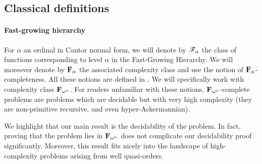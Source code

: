 %	
%	


\subsection{Classical definitions}

\paragraph*{Fast-growing hierarchy}

For $\alpha$ an ordinal in Cantor normal form, we will denote by $\mathscr{F}_{\alpha}$ the class of functions corresponding to level $\alpha$ in the Fast-Growing Hierarchy. We will moreover denote by $\mathbf{F}_{\alpha}$ the associated complexity class and use the notion of $\mathbf{F}_{\alpha}$-completeness. All these notions are defined in \cite{Schmitz16}. We will specifically work with complexity class $\mathbf{F}_{\omega^{\omega}}$. For readers unfamiliar with these notions, $\mathbf{F}_{\omega^{\omega}}$-complete problems are problems which are decidable but with very high complexity (they are non-primitive recursive, and even hyper-Ackermannian). 

We highlight that our main result is the decidability of the problem. In fact, proving that the problem lies in $\mathbf{F}_{\omega^{\omega}}$ does not complicate our decidability proof significantly. Moreover, this result fits nicely into the landscape of high-complexity problems arising from well quasi-orders. 

